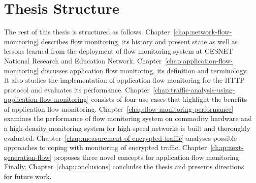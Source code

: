 \section{Thesis Structure}

The rest of this thesis is structured as follows. Chapter~\ref{chap:network-flow-monitoring} describes flow monitoring, its history and present state as well as lessons learned from the deployment of flow monitoring system at CESNET National Research and Education Network. Chapter~\ref{chap:application-flow-monitoring} discusses application flow monitoring, its definition and terminology.  It also studies the implementation of application flow monitoring for the HTTP protocol and evaluates its performance. Chapter~\ref{chap:traffic-analysis-using-application-flow-monitoring} consists of four use cases that highlight the benefits of application flow monitoring. Chapter~\ref{chap:flow-monitoring-performance} examines the performance of flow monitoring system on commodity hardware and a high-density monitoring system for high-speed networks is built and thoroughly evaluated. Chapter~\ref{chap:measurement-of-encrypted-traffic} analyses possible approaches to coping with monitoring of encrypted traffic. Chapter~\ref{chap:next-generation-flow} proposes three novel concepts for application flow monitoring. Finally, Chapter~\ref{chap:conclusions} concludes the thesis and presents directions for future work.
